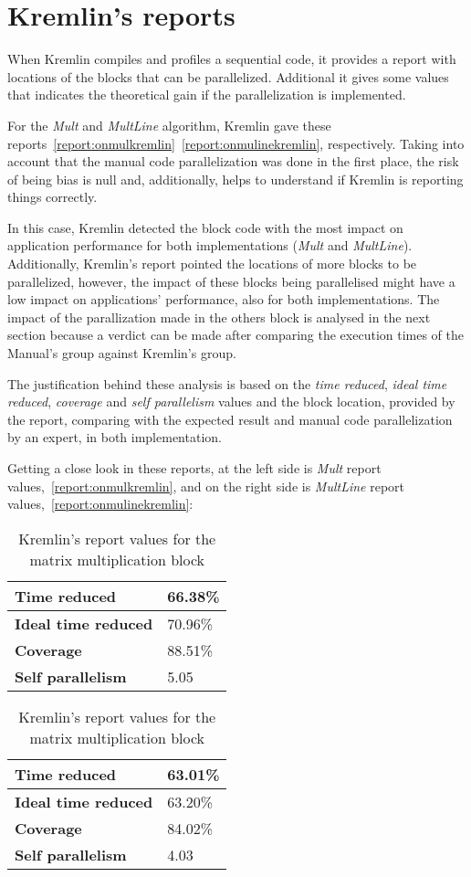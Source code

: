 \section{Kremlin's reports}\label{sec:kremlinreport}

When Kremlin compiles and profiles a sequential code, it provides a report with locations of the blocks that can be parallelized. Additional it gives some values that indicates the theoretical gain if the parallelization is implemented.

For the \textit{Mult} and \textit{MultLine} algorithm, Kremlin gave these reports~\ref{report:onmulkremlin}~\ref{report:onmulinekremlin}, respectively. Taking into account that the manual code parallelization was done in the first place, the risk of being bias is null and, additionally, helps to understand if Kremlin is reporting things correctly.

In this case, Kremlin detected the block code with the most impact on application performance for both implementations (\textit{Mult} and \textit{MultLine}). Additionally, Kremlin's report pointed the locations of more blocks to be parallelized, however, the impact of these blocks being parallelised might have a low impact on applications' performance, also for both implementations. The impact of the parallization made in the others block is analysed in the next section because a verdict can be made after comparing the execution times of the Manual's group against Kremlin's group. 

The justification behind these analysis is based on the \textit{ time reduced}, \textit{ideal time reduced}, \textit{coverage} and \textit{self parallelism} values and the block location, provided by the report, comparing with the expected result and manual code parallelization by an expert, in both implementation.

Getting a close look in these reports, at the left side is \textit{Mult} report values,~\ref{report:onmulkremlin}, and on the right side is \textit{MultLine} report values,~\ref{report:onmulinekremlin}:

\begin{table}[htb]
\centering
\caption{Kremlin's report values for the matrix multiplication block}
\begin{tabular}{ |l|l| }
	\hline
	\textbf{Time reduced} & 66.38\% \\ \hline
	\textbf{Ideal time reduced} & 70.96\% \\ \hline
	\textbf{Coverage} & 88.51\% \\ \hline
	\textbf{Self parallelism} & 5.05 \\
	\hline
\end{tabular}
\quad
\begin{tabular}{ |l|l| }
	\hline
	\textbf{Time reduced} & 63.01\% \\ \hline
	\textbf{Ideal time reduced} & 63.20\% \\ \hline
	\textbf{Coverage} & 84.02\% \\ \hline
	\textbf{Self parallelism} & 4.03 \\
	\hline
\end{tabular}
\end{table}

